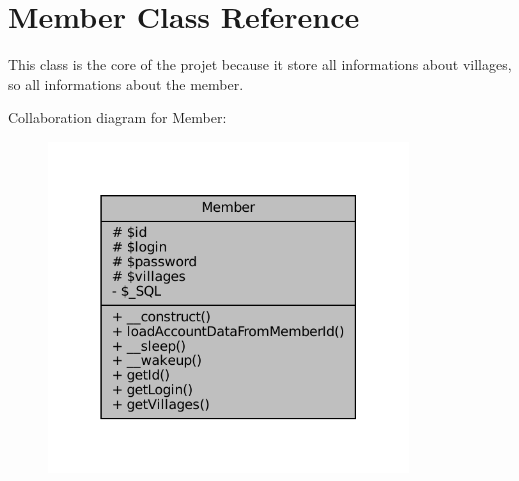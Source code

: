 \hypertarget{classMember}{}\section{Member Class Reference}
\label{classMember}


This class is the core of the projet because it store all informations about villages, so all informations about the member.  




Collaboration diagram for Member\+:\nopagebreak
\begin{figure}[H]
\begin{center}
\leavevmode
\includegraphics[width=271pt]{classMember__coll__graph}
\end{center}
\end{figure}
